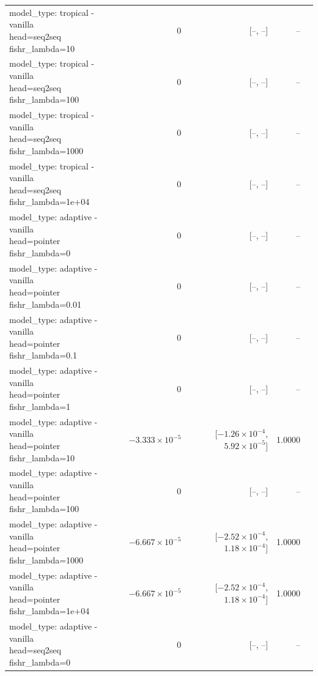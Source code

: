 \documentclass[10pt]{article}
\makeatletter
\newcommand{\stackcell}[1]{\begin{tabular}[t]{@{}l@{}}#1\end{tabular}}
\makeatother
\begin{document}
{\begin{longtable}{lrrrl}
\stackcell{model\_type: tropical - vanilla\\\footnotesize head=seq2seq fishr\_lambda=10 } & 0 & [--, --] & -- & \\
\stackcell{model\_type: tropical - vanilla\\\footnotesize head=seq2seq fishr\_lambda=100 } & 0 & [--, --] & -- & \\
\stackcell{model\_type: tropical - vanilla\\\footnotesize head=seq2seq fishr\_lambda=1000 } & 0 & [--, --] & -- & \\
\stackcell{model\_type: tropical - vanilla\\\footnotesize head=seq2seq fishr\_lambda=1e+04 } & 0 & [--, --] & -- & \\
\stackcell{model\_type: adaptive - vanilla\\\footnotesize head=pointer fishr\_lambda=0 } & 0 & [--, --] & -- & \\
\stackcell{model\_type: adaptive - vanilla\\\footnotesize head=pointer fishr\_lambda=0.01 } & 0 & [--, --] & -- & \\
\stackcell{model\_type: adaptive - vanilla\\\footnotesize head=pointer fishr\_lambda=0.1 } & 0 & [--, --] & -- & \\
\stackcell{model\_type: adaptive - vanilla\\\footnotesize head=pointer fishr\_lambda=1 } & 0 & [--, --] & -- & \\
\stackcell{model\_type: adaptive - vanilla\\\footnotesize head=pointer fishr\_lambda=10 } & $-3.333\times10^{-5}$ & [$-1.26\times10^{-4}$, $5.92\times10^{-5}$] & 1.0000 & \\
\stackcell{model\_type: adaptive - vanilla\\\footnotesize head=pointer fishr\_lambda=100 } & 0 & [--, --] & -- & \\
\stackcell{model\_type: adaptive - vanilla\\\footnotesize head=pointer fishr\_lambda=1000 } & $-6.667\times10^{-5}$ & [$-2.52\times10^{-4}$, $1.18\times10^{-4}$] & 1.0000 & \\
\stackcell{model\_type: adaptive - vanilla\\\footnotesize head=pointer fishr\_lambda=1e+04 } & $-6.667\times10^{-5}$ & [$-2.52\times10^{-4}$, $1.18\times10^{-4}$] & 1.0000 & \\
\stackcell{model\_type: adaptive - vanilla\\\footnotesize head=seq2seq fishr\_lambda=0 } & 0 & [--, --] & -- & \\

\end{longtable}}
\end{document}
